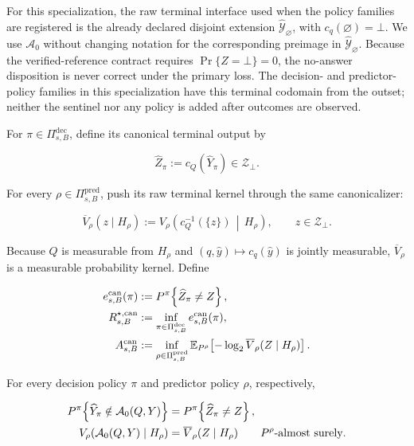 \documentclass[10pt]{article} %
\providecommand{\1}{\mathbf{1}}  %
\theoremstyle{remark}
\theoremstyle{definition}
\begin{document}
For this specialization, the raw terminal interface used when the policy
families are registered is the already declared disjoint extension
$\widehat{\mathcal Y}_{\varnothing}$, with $c_q(\varnothing)=\bot$. We use
$\mathcal A_0$ without changing notation for the corresponding preimage in
$\widehat{\mathcal Y}_{\varnothing}$.  Because the verified-reference
contract requires $\Pr\{Z=\bot\}=0$, the no-answer disposition is never
correct under the primary loss.  The decision- and predictor-policy families
in this specialization have this terminal codomain from the outset; neither
the sentinel nor any policy is added after outcomes are observed.

For $\pi\in\Pi_{s,B}^{\mathrm{dec}}$, define its canonical terminal output by

\begin{equation}
\widehat Z_\pi
:=
c_Q\!\left(\widehat Y_\pi\right)
\in\mathcal Z_{\bot}.
\label{eq:canonical-terminal-rule}
\end{equation}

For every $\rho\in\Pi_{s,B}^{\mathrm{pred}}$, push its raw terminal kernel
through the same canonicalizer:

\begin{equation}
\overline V_\rho(z\mid H_\rho)
:=
V_\rho\!\left(
c_Q^{-1}(\{z\})
\,\middle|\,
H_\rho
\right),
\qquad
z\in\mathcal Z_{\bot}.
\label{eq:canonical-kernel-pushforward}
\end{equation}

Because $Q$ is measurable from $H_\rho$ and $(q,\widehat y)\mapsto
c_q(\widehat y)$ is jointly measurable, $\overline V_\rho$ is a measurable
probability kernel.  Define

\begin{align}
e_{s,B}^{\mathrm{can}}(\pi)
&:=
P^\pi\!\left\{\widehat Z_\pi\neq Z\right\},
\notag\\
R_{s,B}^{\star,\mathrm{can}}
&:=
\inf_{\pi\in\Pi_{s,B}^{\mathrm{dec}}}
e_{s,B}^{\mathrm{can}}(\pi),
\label{eq:canonical-family-risk}
\\
A_{s,B}^{\mathrm{can}}
&:=
\inf_{\rho\in\Pi_{s,B}^{\mathrm{pred}}}
\mathbb E_{P^\rho}\!\left[
-\log_2\overline V_\rho(Z\mid H_\rho)
\right].
\label{eq:canonical-family-residual}
\end{align}

For every decision policy $\pi$ and predictor policy $\rho$, respectively,

\begin{align}
P^\pi\!\left\{
\widehat Y_\pi\notin\mathcal A_0(Q,Y)
\right\}
&=
P^\pi\!\left\{
\widehat Z_\pi\neq Z
\right\},
\notag\\
V_\rho\!\left(
\mathcal A_0(Q,Y)\mid H_\rho
\right)
&=
\overline V_\rho(Z\mid H_\rho)
\qquad P^\rho\text{-almost surely}.
\label{eq:canonical-preimage-identities}
\end{align}
\end{document}
